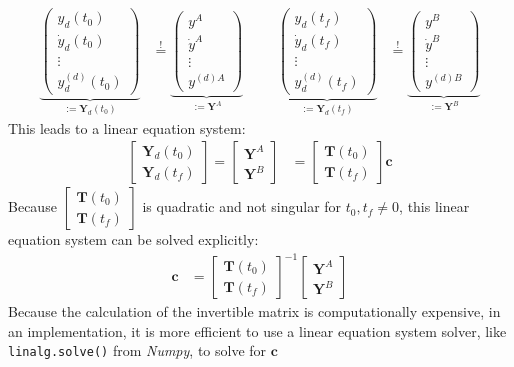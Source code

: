 \documentclass[a4paper,11pt,headings=standardclasses,parskip=half]{scrartcl}
\begin{document}
\begin{align*}
\underbrace{\begin{pmatrix} y_d(t_0) \\ \dot{y}_d(t_0) \\ \vdots \\ y_d^{(d)}(t_0) \end{pmatrix}}_{:=\mathbf{Y}_d(t_0)}
&\overset{!}{=}
\underbrace{\begin{pmatrix} y^A \\ \dot{y}^A \\ \vdots \\ y^{(d)A}  \end{pmatrix}}_{:=\mathbf{Y}^A}
&&&
\underbrace{\begin{pmatrix} y_d(t_f) \\ \dot{y}_d(t_f) \\ \vdots \\ y_d^{(d)}(t_f) \end{pmatrix}}_{:=\mathbf{Y}_d(t_f)}
&\overset{!}{=}
\underbrace{\begin{pmatrix} y^B \\ \dot{y}^B \\ \vdots \\ y^{(d)B}  \end{pmatrix}}_{:=\mathbf{Y}^B}
\end{align*}
This leads to a linear equation system:
\begin{align*}
\begin{bmatrix}
\mathbf{Y}_d(t_0) \\
\mathbf{Y}_d(t_f) 
\end{bmatrix}
=
\begin{bmatrix}
\mathbf{Y}^A \\
\mathbf{Y}^B
\end{bmatrix}
&=
\begin{bmatrix}
\mathbf{T}(t_0) \\
\mathbf{T}(t_f) 
\end{bmatrix}
\mathbf{c}
\end{align*}
Because $\begin{bmatrix}
\mathbf{T}(t_0) \\
\mathbf{T}(t_f) 
\end{bmatrix}$ is quadratic and not singular for $t_0,t_f\neq 0$, this linear equation system can be solved explicitly:
\begin{align}
\label{eq:2}
\mathbf{c} &= \begin{bmatrix}
\mathbf{T}(t_0) \\
\mathbf{T}(t_f) 
\end{bmatrix}^{-1}
\begin{bmatrix}
\mathbf{Y}^A \\
\mathbf{Y}^B
\end{bmatrix}
\end{align}
Because the calculation of the invertible matrix is computationally expensive, in an implementation, it is more efficient to use a linear equation system solver, like \texttt{linalg.solve()} from \emph{Numpy}, to solve for $\mathbf{c}$
\end{document}

